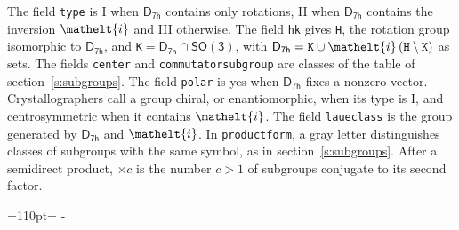 \documentclass[10pt,a4paper]{article}
\makeatletter
\def\grouprule#1#2{\noalign{\marks\LTgroupmarks{\the\belowrulesep}\nobreak\vskip#1%
  \vskip\aboverulesep}\multispan\LT@cols\unskip{\leaders\hrule\@height#2\hfill\kern\z@}\cr
  \noalign{\penalty\LTrulebreak\vskip\belowrulesep\global\@lastruleclass\z@}}
\newcommand{\needspace}[1]{\par\penalty-100\begingroup\dimen0=#1\relax\dimen2=\pagegoal
  \advance\dimen2-\pagetotal\ifdim\dimen0>\dimen2\relax\ifdim\dimen2>0pt\vfil\break\fi\fi
  \endgroup}
\numberwithin{equation}{section}
\newcommand{\eltfont}[1]{{\let\sigma\eltsigma\mathelt{#1}}}
\newcommand{\grp}[1]{\mathsf{#1}}
\newcommand{\elt}[1]{\eltfont{#1}}
\newcommand{\hmname}[1]{#1}
\newcommand{\orbname}[1]{#1}
\newcommand{\conwayname}[1]{#1}
\newcommand{\igname}[1]{#1}
\newcommand{\olivename}[1]{#1}
\newcommand{\dirprod}{\times}
\newcommand{\sdprod}{\rtimes}
\newcommand{\nconj}[1]{{\scriptsize$\times#1$}}
\newcommand{\clsletter}[1]{\,{\scriptsize\color{black!55}#1}}
\makeatother
\begin{document}
{}
\leavevmode\label{n:element.inversion}The field \texttt{type} is I when $\grp{D_{7h}}$ contains only rotations, II when $\grp{D_{7h}}$ contains the inversion $\elt{i}$ and III otherwise. The field \texttt{hk} gives \texttt{H}, the rotation group isomorphic to $\grp{D_{7h}}$, and \texttt{K}${} = \grp{D_{7h}} \cap \grp{SO(3)}$, with $\grp{D_{7h}} = \texttt{K} \cup \elt{i}\,(\texttt{H} \setminus \texttt{K})$ as sets. The fields \texttt{center} and \texttt{commutatorsubgroup} are classes of the table of section~\ref{s:subgroups}. The field \texttt{polar} is yes when $\grp{D_{7h}}$ fixes a nonzero vector. Crystallographers call a group chiral, or enantiomorphic, when its type is I, and centrosymmetric when it contains $\elt{i}$. The field \texttt{laueclass} is the group generated by $\grp{D_{7h}}$ and $\elt{i}$.
In \texttt{productform}, a gray letter distinguishes classes of subgroups with the same symbol, as in section~\ref{s:subgroups}. \label{n:index.conjugates.c}After a semidirect product, ${\times}c$ is the number $c > 1$ of subgroups conjugate to its second factor.
\needspace{110pt}
\end{document}
